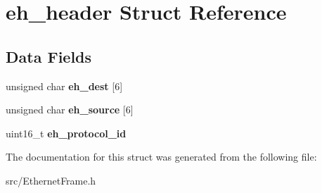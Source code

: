 \hypertarget{structeh__header}{\section{eh\-\_\-header Struct Reference}
\label{structeh__header}
}
\subsection*{Data Fields}
\begin{DoxyCompactItemize}
\item 
\hypertarget{structeh__header_af33cdb71413c6dbe2dbea747f7958e30}{unsigned char {\bfseries eh\-\_\-dest} \mbox{[}6\mbox{]}}\label{structeh__header_af33cdb71413c6dbe2dbea747f7958e30}

\item 
\hypertarget{structeh__header_a38a48a02116d55f38959fc3128eaa999}{unsigned char {\bfseries eh\-\_\-source} \mbox{[}6\mbox{]}}\label{structeh__header_a38a48a02116d55f38959fc3128eaa999}

\item 
\hypertarget{structeh__header_a3056f889bfffa7fdb3ae73afddfdbbf9}{uint16\-\_\-t {\bfseries eh\-\_\-protocol\-\_\-id}}\label{structeh__header_a3056f889bfffa7fdb3ae73afddfdbbf9}

\end{DoxyCompactItemize}


The documentation for this struct was generated from the following file\-:\begin{DoxyCompactItemize}
\item 
src/Ethernet\-Frame.\-h\end{DoxyCompactItemize}
